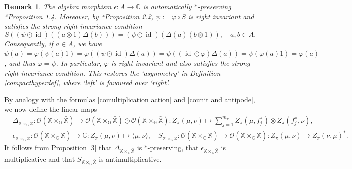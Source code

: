 \documentclass[reqno]{amsart}
\numberwithin{equation}{section}
\newtheorem{Rem}[Theorem]{Remark}
\newcommand\XGX{\X\times_\G \bar{\X}}
\DeclareMathOperator{\id}{\mathrm{id}}
\newcommand{\mcO}{\mathcal{O}}
\newcommand{\C}{\mathbb{C}}
\newcommand{\G}{\mathbb{G}}
\newcommand{\X}{\mathbb{X}}
\begin{document}
\begin{Rem} The algebra morphism $\epsilon: A \to \C$ is automatically $*$-preserving \cite{DVD11a}*{Proposition 1.4}. Moreover, by \cite{DVD11a}*{Proposition 2.2}, $\psi:= \varphi\circ S$ is right invariant  and satisfies the strong right invariance condition
$$S((\psi \odot \id)((a\otimes 1)\Delta(b)))= (\psi \odot \id)(\Delta(a)(b\otimes 1)), \quad a,b\in A.$$ Consequently, if $a\in A$, we have $\psi(a) = \varphi(\psi(a)1) = \varphi((\psi \odot \id)\Delta(a)) = \psi((\id \odot \varphi)\Delta(a)) = \psi(\varphi(a)1) = \varphi(a)$, and thus $\varphi= \psi$. In particular, $\varphi$ is right invariant and also satisfies the strong right invariance condition.
This restores the `asymmetry' in Definition \ref{compacthyperdef}, where `left' is favoured over `right'.
\end{Rem}

By analogy with the formulas \eqref{comultiplication action} and \eqref{counit and antipode}, we now define the linear maps
\begin{align*}
&\Delta_{\XGX}: \mcO(\XGX)\to \mcO(\XGX)\odot \mcO(\XGX): Z_\pi(\mu, \nu)\mapsto \sum_{j=1}^{m_\pi} Z_\pi(\mu, f_j^\pi)\otimes Z_\pi(f_j^\pi, \nu),\\
    &\epsilon_{\XGX}: \mcO(\XGX)\to \C: Z_\pi(\mu, \nu)\mapsto \langle \mu, \nu\rangle, \quad S_{\XGX}: \mcO(\XGX)\to \mcO(\XGX): Z_\pi(\mu, \nu)\mapsto Z_\pi(\nu, \mu)^*.
\end{align*}
It follows from Proposition \ref{3} that $\Delta_{\XGX}$ is $*$-preserving, that $\epsilon_{\XGX}$ is multiplicative and that $S_{\XGX}$ is antimultiplicative.
\end{document}
